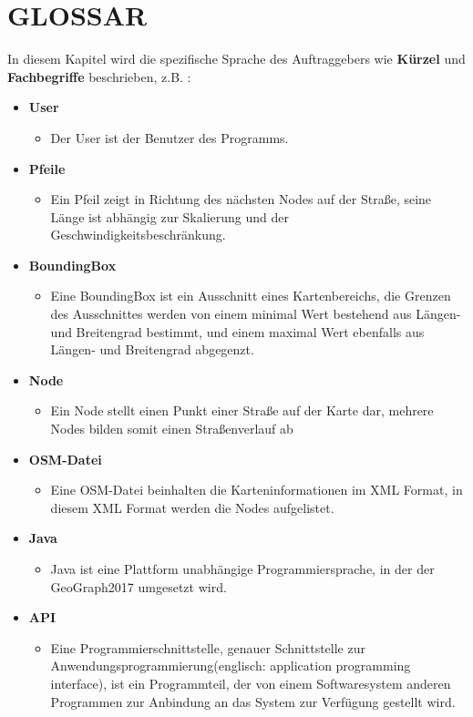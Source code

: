 	\section{\Large GLOSSAR}
	In diesem Kapitel wird die spezifische Sprache des Auftraggebers wie \textbf{ Kürzel } und \textbf{ Fachbegriffe } beschrieben, z.B. :
	\begin{itemize}
		\item \textbf{ User }
		\begin{itemize}
			\item Der User ist der Benutzer des Programms.
		\end{itemize}
		\item \textbf{ Pfeile }
		\begin{itemize}
			\item Ein Pfeil zeigt in Richtung des nächsten Nodes auf der Straße, seine Länge ist abhängig zur Skalierung und der Geschwindigkeitsbeschränkung.
		\end{itemize}
		\item \textbf{ BoundingBox }
		\begin{itemize}
			\item Eine BoundingBox ist ein Ausschnitt eines Kartenbereichs, die Grenzen des Ausschnittes werden von einem minimal Wert bestehend aus Längen- und Breitengrad bestimmt, und einem maximal Wert ebenfalls aus Längen- und Breitengrad abgegenzt. 
		\end{itemize}
		\item \textbf{ Node }
		\begin{itemize}
			\item Ein Node stellt einen Punkt einer Straße auf der Karte dar, mehrere Nodes bilden somit einen Straßenverlauf ab
		\end{itemize}
		\item \textbf{ OSM-Datei }
		\begin{itemize}
			\item Eine OSM-Datei beinhalten die Karteninformationen im XML Format, in diesem XML Format werden die Nodes aufgelistet. 
		\end{itemize}
		\item \textbf{ Java }
		\begin{itemize}
			\item Java ist eine Plattform unabhängige Programmiersprache, in der der GeoGraph2017 umgesetzt wird.
		\end{itemize}
		\item \textbf{ API }
		\begin{itemize}
			\item Eine Programmierschnittstelle, genauer Schnittstelle zur Anwendungsprogrammierung(englisch: application programming interface), ist ein Programmteil, der von einem Softwaresystem anderen Programmen zur Anbindung an das System zur Verfügung gestellt wird. 
		\end{itemize}
	\end{itemize}

		